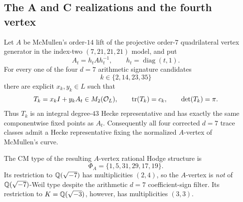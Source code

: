 \subsection{The A and C realizations and the fourth vertex}
\begin{theorem}\label{thm:Avertex}
Let $A$ be McMullen's order-$14$ lift of the projective order-$7$ quadrilateral vertex generator in the index-two $(7,21,21,21)$ model, and put
\[
 A_t=h_tAh_t^{-1},\qquad h_t=\operatorname{diag}(t,1).
\]
For every one of the four $d=7$ arithmetic signature candidates
\[
 k\in\{2,14,23,35\}
\]
there are explicit $x_k,y_k\in L$ such that
\[
 T_k=x_kI+y_kA_t\in M_2(\mathcal O_L),
 \qquad
 \operatorname{tr}(T_k)=c_k,
 \qquad
 \det(T_k)=\pi.
\]
Thus $T_k$ is an integral degree-$43$ Hecke representative and has exactly the same componentwise fixed points as $A_t$.  Consequently all four corrected $d=7$ trace classes admit a Hecke representative fixing the normalized $A$-vertex of McMullen's curve.

The CM type of the resulting $A$-vertex rational Hodge structure is
\[
 \Phi_A=\{1,5,31,29,17,19\}.
\]
Its restriction to $\mathbb Q(\sqrt{-7})$ has multiplicities $(2,4)$, so the $A$-vertex is \emph{not} of $\mathbb Q(\sqrt{-7})$-Weil type despite the arithmetic $d=7$ coefficient-sign filter.  Its restriction to $K=\mathbb Q(\sqrt{-3})$, however, has multiplicities $(3,3)$.
\end{theorem}
